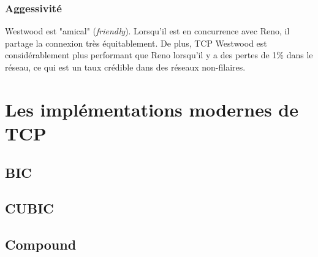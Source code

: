 \documentclass[	DIV=calc,%
							paper=a4,%
							fontsize=11pt,%
							twocolumn]{scrartcl}	 					%
\begin{document}
\subsubsection*{Aggessivité}
Westwood est "amical" (\textit{friendly}). Lorsqu'il est en concurrence avec Reno, il partage la connexion très équitablement. De plus, TCP Westwood est considérablement plus performant que Reno lorsqu'il y a des pertes de 1\% dans le réseau, ce qui est un taux crédible dans des réseaux non-filaires.

\section*{Les implémentations modernes de TCP}
\subsection*{BIC}
\subsection*{CUBIC}
\subsection*{Compound}
\end{document}

